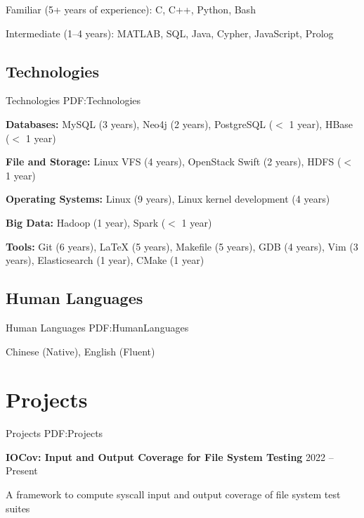 \documentclass[letterpaper,10pt,oneside]{article}
\begin{document}
\begin{body}
\BulletItem
Familiar (5+ years of experience): C, C++, Python, Bash

\GapNoBreak

\BulletItem
Intermediate (1--4 years): MATLAB, SQL, Java, Cypher, JavaScript, Prolog



\subsection
{Technologies}
{Technologies}
{PDF:Technologies}

\BulletItem
\textbf{Databases:} MySQL (3 years), Neo4j (2 years), PostgreSQL ($<$ 1 year), HBase ($<$ 1 year)

\GapNoBreak

\BulletItem
\textbf{File and Storage:} Linux VFS (4 years), OpenStack Swift (2 years), HDFS ($<$ 1 year)

\GapNoBreak

\BulletItem
\textbf{Operating Systems:} Linux (9 years), Linux kernel development (4 years)

\GapNoBreak

\BulletItem
\textbf{Big Data:} Hadoop (1 year), Spark ($<$ 1 year)

\GapNoBreak

\BulletItem
\textbf{Tools:} Git (6 years), {\LaTeX} (5 years), Makefile (5 years), GDB (4 years), Vim (3 years), Elasticsearch (1 year), CMake (1 year)

\subsection
{Human Languages}
{Human Languages}
{PDF:HumanLanguages}

\BulletItem
Chinese (Native), English (Fluent)
\GapNoBreak

\section
{Projects}
{Projects}
{PDF:Projects}

\textbf{IOCov: Input and Output Coverage for File System Testing}
\hfill
2022 -- 
Present

\BulletItem
A framework to compute syscall input and output coverage of file system test suites

\GapNoBreak


\end{body}
\end{document}
